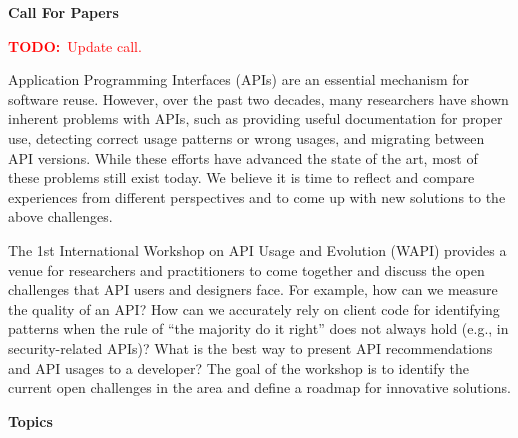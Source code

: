 \documentclass[10pt, conference]{IEEEtran}
\newcommand{\todo}[1]{{\textcolor{red}{\textbf{TODO:}~#1}}}
\newcommand{\shortname}{WAPI}
\begin{document}



\newpage
\onecolumn

\begin{center}
\Large{\textbf{Call For Papers}}
\end{center}

\todo{Update call.}

Application Programming Interfaces (APIs) are an essential mechanism for software reuse. However, over the past two decades, many researchers have shown inherent problems with APIs, such as providing useful documentation for proper use, detecting correct usage patterns or wrong usages, and migrating between API versions. While these efforts have advanced the state of the art, most of these problems still exist today. We believe it is time to reflect and compare experiences from different perspectives and to come up with new solutions to the above challenges. 

The 1st International Workshop on API Usage and Evolution (\shortname{}) provides a venue for researchers and practitioners to come together and discuss the open challenges that API users and designers face. For example, how can we measure the quality of an API? How can we accurately rely on client code for identifying patterns when the rule of ``the majority do it right'' does not always hold (e.g., in security-related APIs)? What is the best way to present API recommendations and API usages to a developer? The goal of the workshop is to identify the current open challenges in the area and define a roadmap for innovative solutions.


\vspace{0.2cm}

\noindent
\textbf{\large Topics}
\vspace{0.2cm}
\end{document}
